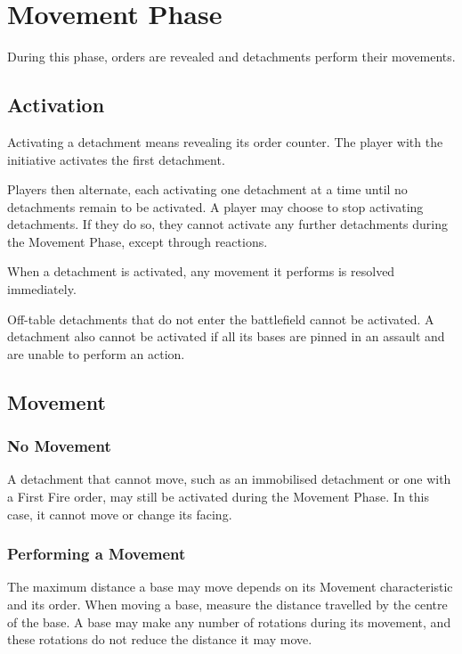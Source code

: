 \section{Movement Phase}

During this phase, orders are revealed and detachments perform their movements.

\subsection{Activation}

Activating a detachment means revealing its order counter. The player with the initiative activates the first detachment.

Players then alternate, each activating one detachment at a time until no detachments remain to be activated. A player may choose to stop activating detachments. If they do so, they cannot activate any further detachments during the Movement Phase, except through reactions.

When a detachment is activated, any movement it performs is resolved immediately.

Off-table detachments that do not enter the battlefield cannot be activated. A detachment also cannot be activated if all its bases are pinned in an assault and are unable to perform an action.

\subsection{Movement}

\subsubsection{No Movement}

A detachment that cannot move, such as an immobilised detachment or one with a First Fire order, may still be activated during the Movement Phase. In this case, it cannot move or change its facing.

\subsubsection{Performing a Movement}

The maximum distance a base may move depends on its Movement characteristic and its order. When moving a base, measure the distance travelled by the centre of the base. A base may make any number of rotations during its movement, and these rotations do not reduce the distance it may move.

